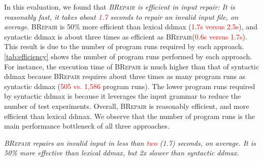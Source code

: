 \documentclass[sigconf,review,anonymous]{acmart}
\newenvironment{result}{\begin{framed}\centering\it}{\end{framed}}
\newcommand{\recheck}[1]{\textcolor{red}{#1}}
\newcommand{\approach}{\textsc{BRepair}\xspace}
\begin{document}
In this evaluation, we found that \textit{\approach is efficient in input repair: It is reasonably fast, it takes about \recheck{1.7} seconds to repair an invalid input file, on average}. 
\approach is 50\% more efficient than lexical ddmax (\recheck{1.7s versus 2.5s}), and syntactic ddmax is about three times as efficient as \approach (\recheck{0.6s versus 1.7s}). 
This result is %
due to the %
number of program runs required by each approach. 
\autoref{tab:efficiency} %
shows %
the number of %
program runs performed by each approach. %
For instance, the execution time 
of \approach %
is much higher %
than that of syntactic ddmax 
because \approach requires about three times as many program runs as syntactic ddmax (\recheck{505 vs. 1,586} program runs). 
The lower program runs required by syntactic ddmax is because %
it leverages the input grammar to reduce the number of test experiments. 
Overall, %
\approach is reasonably efficient, and %
more efficient than lexical ddmax. %
We observe that the number of program runs is the main performance bottleneck of all three approaches. %

\begin{result}
\approach %
repairs an invalid input in less than \recheck{two} (1.7) seconds, on average. %
It is 50\% more effective than lexical ddmax, but 2x slower than syntactic ddmax. 
\end{result}
\end{document}
